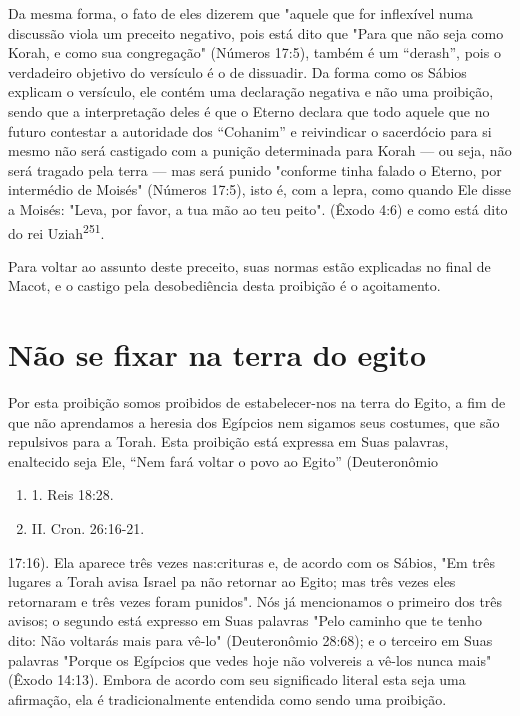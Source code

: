 Da mesma forma, o fato de eles dizerem que "aquele que for inflexí­vel
numa discussão viola um preceito negativo, pois está dito que "Para que
não seja como Korah, e como sua congregação" (Números 17:5), também é um
``derash'', pois o verdadeiro objetivo do versículo é o de dissuadir. Da
forma como os Sábios explicam o versículo, ele contém uma declaração
negativa e não uma proibição, sendo que a interpretação deles é que o
Eterno declara que todo aquele que no futuro contestar a autoridade dos
``Cohanim'' e reivindicar o sacerdócio para si mesmo não será castigado
com a punição determinada pa­ra Korah --- ou seja, não será tragado pela
terra --- mas será punido "conforme tinha falado o Eterno, por
intermédio de Moisés" (Números 17:5), isto é, com a lepra, como quando
Ele disse a Moisés: "Leva, por favor, a tua mão ao teu peito". (Êxodo
4:6) e como está dito do rei Uziah\textsuperscript{251}.

Para voltar ao assunto deste preceito, suas normas estão explicadas no
final de Macot, e o castigo pela desobediência desta proibição é o
açoitamento.

\section{Não se fixar na terra do egito}

Por esta proibição somos proibidos de estabelecer-nos na terra do Egito,
a fim de que não aprendamos a heresia dos Egípcios nem sigamos seus
costumes, que são repulsivos para a Torah. Esta proibição está expressa
em Suas palavras, enaltecido seja Ele, ``Nem fará voltar o povo ao Egito''
(Deuteronômio


\begin{enumerate}
\def\labelenumi{\arabic{enumi}.}
\setcounter{enumi}{249}
\item
 
 1. Reis 18:28.
 
\item
 
 II. Cron. 26:16-21.
 
\end{enumerate}


17:16). Ela aparece três vezes nas:crituras e, de acordo com os Sábios,
"Em três lugares a Torah avisa Israel pa não retornar ao Egito; mas três
vezes eles retornaram e três vezes foram punidos". Nós já mencionamos o
primeiro dos três avisos; o segundo está expresso em Suas palavras "Pelo
caminho que te tenho dito: Não voltarás mais para vê-lo" (Deuteronômio
28:68); e o terceiro em Suas palavras "Porque os Egípcios que vedes hoje
não volvereis a vê-los nunca mais" (Êxodo 14:13). Embora de acordo com
seu significado literal esta seja uma afirmação, ela é tradicionalmente
entendida como sendo uma proibição.


